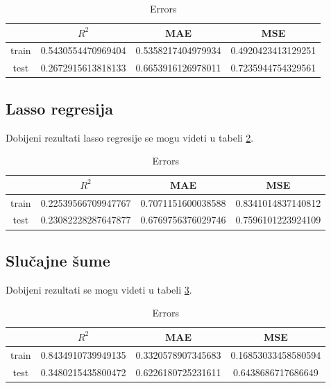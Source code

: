 \documentclass[a4paper]{article}
\begin{document}
\begin{table}[h!]
\caption{Errors}
\centering %
\begin{tabular}{c c c c} %
\hline\hline %
 & ${R}^2$ & MAE & MSE \\ [0.2ex] %
\hline %
train & 0.5430554470969404 & 0.5358217404979934 & 0.4920423413129251 \\ %
test & 0.2672915613818133 & 0.6653916126978011 & 0.7235944754329561 \\  %
\end{tabular}
\label{table:table_11}
\end{table}

\pagebreak

\subsection{Lasso regresija}
\label{sec:lasso_regresija_2}

Dobijeni rezultati lasso regresije se mogu videti u tabeli \ref{table:table_12}.

\begin{table}[h!]
\caption{Errors}
\centering %
\begin{tabular}{c c c c} %
\hline\hline %
 & ${R}^2$ & MAE & MSE \\ [0.2ex] %
\hline %
train & 0.22539566709947767 & 0.7071151600038588 & 0.8341014837140812 \\ %
test & 0.23082228287647877 & 0.6769756376029746 & 0.7596101223924109 \\ [1ex] %
\end{tabular}
\label{table:table_12}
\end{table}


\subsection{Slučajne šume}
\label{sec:slucajne_sume_2}

Dobijeni rezultati se mogu videti u tabeli \ref{table:table_13}.

\begin{table}[h!]
\caption{Errors}
\centering %
\begin{tabular}{c c c c} %
\hline\hline %
 & ${R}^2$ & MAE & MSE \\ [0.2ex] %
\hline %
train & 0.8434910739949135 & 0.3320578907345683 & 0.16853033458580594 \\ %
test & 0.3480215435800472 & 0.6226180725231611 & 0.6438686717686649 \\ [1ex] %
\end{tabular}
\label{table:table_13}
\end{table}
\end{document}
